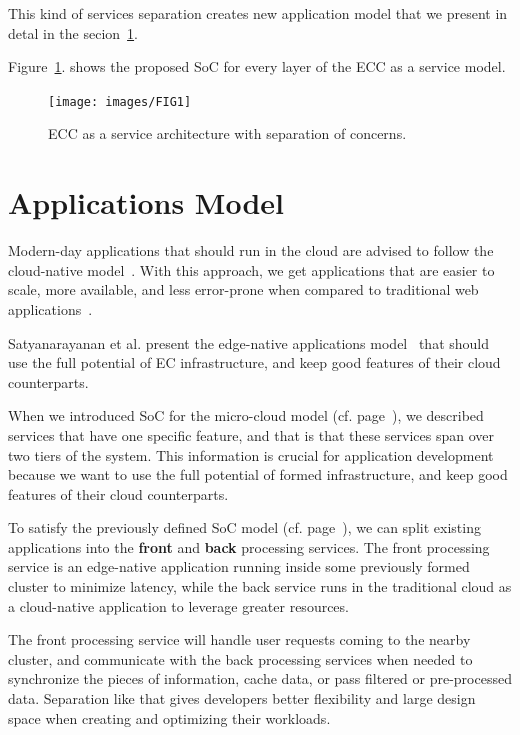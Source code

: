 \noindent
This kind of services separation creates new application model that we present in detal in the secion~\ref{sec:application_model}. 

Figure~\ref{fig:fig10}. shows the proposed SoC for every layer of the ECC as a service model.

\begin{figure}[H]
	\texttt{[image: images/FIG1]}
	\vspace{-0.7cm}
	\caption{ECC as a service architecture with separation of concerns.}
	\label{fig:fig10}
\end{figure}
%
%
\section{Applications Model}\label{sec:application_model}
%
Modern-day applications that should run in the cloud are advised to follow the cloud-native model~\cite{GannonBS17}. With this approach, we get applications that are easier to scale, more available, and less error-prone when compared to traditional web applications~\cite{GannonBS17}. 

Satyanarayanan et al. present the edge-native applications model~\cite{SatyanarayananK19} that should use the full potential of EC infrastructure, and keep good features of their cloud counterparts. 

When we introduced SoC for the micro-cloud model (cf. page~\pageref{services}), we described services that have one specific feature, and that is that these services span over two tiers of the system. This information is crucial for application development because we want to use the full potential of formed infrastructure, and keep good features of their cloud counterparts.

To satisfy the previously defined SoC model (cf. page~\pageref{services}), we can split existing applications into the \textbf{front} and \textbf{back} processing services. The front processing service is an edge-native application running inside some previously formed cluster to minimize latency, while the back service runs in the traditional cloud as a cloud-native application to leverage greater resources.

The front processing service will handle user requests coming to the nearby cluster, and communicate with the back processing services when needed to synchronize the pieces of information, cache data, or pass filtered or pre-processed data. Separation like that gives developers better flexibility and large design space when creating and optimizing their workloads.


